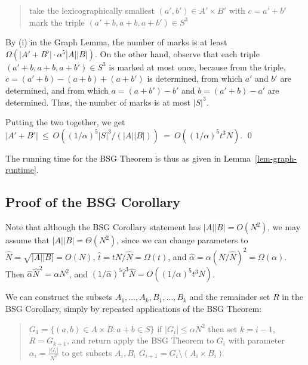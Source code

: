 \documentclass[11pt]{article}
\newcommand{\IGNORE}[1]{}
\begin{document}
{\begin{quote}
\begin{algorithmic}

 \State   take the lexicographically smallest $(a',b') \in  A'\times B'$ with $c = a'+b'$
 \State mark the triple $(a'+b, a+b, a+b')\in S^3$
\EndFor
\EndFor
 \end{algorithmic}
\end{quote}

By (i) in the Graph Lemma, the number of marks is at least
$\Omega(|A'+B'|\cdot \alpha^5 |A||B|)$.
On the other hand, observe that each triple $(a'+b, a+b, a+b')\in S^3$ is
marked at most once, because from the triple,
$c=(a'+b) - (a+b) + (a+b')$ is determined, from which
$a'$ and $b'$ are determined, and from which
$a=(a+b')-b'$ and $b=(a'+b)-a'$ are determined.
Thus, the number of marks is at most $|S|^3$.

Putting the two together, we get
$|A'+B'| \:\le\: O((1/\alpha)^5 |S|^3/(|A||B|))
\:=\: O((1/\alpha)^5 t^3 N)$.
\qed

\bigskip
The running time for the BSG Theorem is thus as given in Lemma~\ref{lem-graph-runtime}.

\subsection{Proof of the BSG Corollary}\label{sec-bsg-corollary-proof}

Note that although the BSG Corollary statement
has $|A||B|=O(N^2)$, we may assume that $|A||B|=\Theta(N^2)$, since
we can change parameters to $\hat{N}=\sqrt{|A||B|} = O(N)$,
$\hat{t}=tN/\hat{N}=\Omega(t)$, and $\hat{\alpha}=\alpha (N/\hat{N})^2=\Omega(\alpha)$.
Then $\hat{\alpha}\hat{N}^2 = \alpha N^2$, and
$(1/\hat{\alpha})^5\hat{t}^3\hat{N} =
 O((1/\alpha)^5 t^3 N)$.

We can construct the subsets $A_1,\ldots,A_k,B_1,\ldots,B_k$ and
the remainder set $R$ in the BSG Corollary, simply by
repeated applications of the BSG Theorem:

\begin{quote}
\begin{algorithmic}[1]
  \State $G_1 = \{(a,b)\in A \times B: a+b\in S\}$
    \State if $|G_i| \leq  \alpha N^2$ then set $k=i-1$, $R=G_{k+1}$, and return
    \State apply the BSG Theorem to $G_i$
with parameter $\alpha_i = \frac{|G_i|}{N^2}$
       to get subsets $A_i,B_i$
    \State  $G_{i+1} = G_i \setminus (A_i\times B_i)$
  \EndFor
 \end{algorithmic}
\end{quote}
\IGNORE{
In line~3, the parameters in the BSG Theorem are
$\hat{N}=\sqrt{|A||B|}\le N$, $\hat{t}=|S|/\hat{N}$, and $\hat{\alpha}_i=|G_i|/\hat{N}^2\ge \alpha$.
Note that $(1/\hat{\alpha}_i)^5\hat{t}^3\hat{N} \:=\:
(\hat{N}^2/|G_i|)^5 (|S|/\hat{N})^3 \hat{N}
\:\le\: (N^2/|G_i|)^5 (|S|/N)^3 N
\:\le\: (1/\alpha)^5 t^3 N$.
}


}
\end{document}
